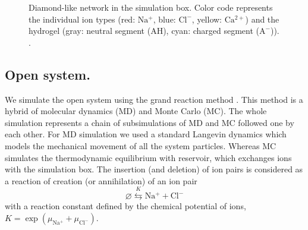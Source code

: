 \documentclass[journal,article,submit,pdftex,moreauthors]{Definitions/mdpi}
\newcommand{\muna}{\mu_\mathrm{Na^+}}
\newcommand{\mucl}{\mu_\mathrm{Cl^-}}
\newcommand{\A}{\mathrm{A^-}}
\newcommand{\AH}{\mathrm{AH}}
\newcommand{\cl}{\mathrm{Cl^-}}
\newcommand{\na}{\mathrm{Na^+}}
\newcommand{\ca}{\mathrm{Ca^{2+}}}
\begin{document}
\begin{figure}[h]
\centering 
{}
\caption{Diamond-like network in the simulation box. Color code represents
the individual ion types (red: $\na$, blue: $\cl$, yellow: $\ca$)
and the hydrogel (gray: neutral segment ($\AH$), cyan: charged segment
($\A$)). \label{fig:open and closed}.}
\end{figure}
\subsection{Open system.}
We simulate the open system using the grand reaction method \cite{Landsgesel2020a,Rud2020}.
This method is a hybrid of molecular dynamics (MD) and Monte Carlo (MC). 
The whole simulation represents a chain of subsimulations of MD and MC followed one by each other. 
For MD simulation we used a standard Langevin dynamics \cite{Grest1986} which models the mechanical movement of all the system particles. 
Whereas MC simulates the thermodynamic equilibrium with reservoir, which exchanges ions with the simulation box. 
The insertion (and deletion) of ion pairs is considered as a reaction of creation (or annihilation) of an ion pair 
\[
\varnothing\stackrel{K}{\leftrightarrows}\na+\cl
\]
with a reaction constant defined by the chemical potential of ions,
$K=\exp\left(\muna+\mucl\right).$
\end{document}
